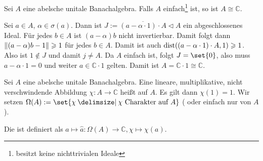 \begin{proposition}[label=prop1.11_einfach]
	Sei $A$ eine abelsche unitale Banachalgebra. Falls $A$ einfach\footnote{besitzt keine nichttrivialen Ideale} ist, so ist $A \cong \mathds{C}$. 
\end{proposition}
\begin{beweis}
	Sei $a \in A$, $\alpha \in \sigma(a)$. Dann ist $J := \overline{(a-\alpha \cdot 1)\cdot A} \lhd A$ ein abgeschlossenes Ideal. Für jedes $b \in A$ ist $(a-\alpha)b$ nicht 
	invertierbar. Damit folgt dann $\norm{(a-\alpha)b - 1}\ge 1$ für jedes $b \in A$. Damit ist auch $\dist\enbrace*{(a-\alpha \cdot 1)\cdot A,1}\ge 1$. Also ist $1 \notin J$ und 
	damit $j \not= A$. Da $A$ einfach ist, folgt $J=\set{0}$, also muss $a-\alpha \cdot 1=0$ und weiter $a \in \mathds{C} \cdot 1$ gelten. Damit ist 
	$A = \mathds{C} \cdot 1 \cong \mathds{C}$.
\end{beweis}

\begin{definition}[{name=[Charakter]}]
	Sei $A$ eine abelsche unitale Banachalgebra. Eine lineare, multiplikative, nicht verschwindende Abbildung $\chi \colon A \to \mathds{C}$ heißt  auf $A$.  
	Es gilt dann $\chi(1)=1$. Wir setzen $\Omega(A) := \set{\chi \given \chi \text{ Charakter auf }A}$ ( oder einfach nur  von $A$).
	
	Die  ist definiert als 
	$a \mapsto \hat{a} \colon \Omega(A) \to \mathds{C}, \chi \mapsto \chi(a)$.
\end{definition}

